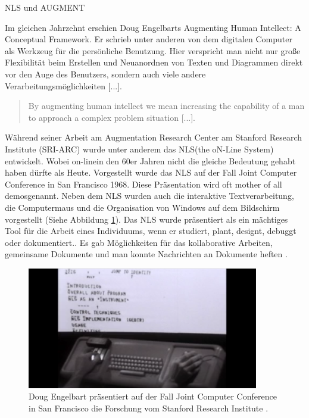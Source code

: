 \begin{section}{NLS und AUGMENT}
\label{sec:nls}

Im gleichen Jahrzehnt erschien Doug Engelbarts \glqq Augmenting Human Intellect: A Conceptual Framework\grqq{ }. Er schrieb unter anderen von dem \glqq digitalen Computer als Werkzeug für die persönliche Benutzung. Hier verspricht man nicht nur große Flexibilität beim Erstellen und Neuanordnen von Texten und Diagrammen direkt vor den Auge des Benutzers, sondern auch viele andere Verarbeitungsmöglichkeiten [...]\grqq{ }\cite[S. 17]{Engelbart1962}.

\begin{quote}
\glqq By augmenting human intellect we mean increasing the capability of a man to approach a complex problem situation [...].\grqq{ }\cite[S. 1]{Engelbart1962}
\end{quote}

Während seiner Arbeit am Augmentation Research Center am Stanford Research Institute (SRI-ARC) wurde unter anderem das \glqq NLS\grqq{ }(the oN-Line System) entwickelt. Wobei \glqq on-line\grqq{ }in den 60er Jahren nicht die gleiche Bedeutung gehabt haben dürfte als Heute. Vorgestellt wurde das NLS auf der Fall Joint Computer Conference in San Francisco 1968. Diese Präsentation wird oft \glqq mother of all demos\grqq{ }genannt. Neben dem NLS wurden auch die interaktive Textverarbeitung, die Computermaus und die Organisation von Windows auf dem Bildschirm vorgestellt (Siehe Abbildung \ref{fig:mother}). Das NLS wurde präsentiert als \glqq ein mächtiges Tool für die Arbeit eines Individuums, wenn er studiert, plant, designt, debuggt oder dokumentiert.\grqq{ }\cite{MotherOfDemo1968}. Es gab Möglichkeiten für das kollaborative Arbeiten, gemeinsame Dokumente und man konnte Nachrichten an Dokumente heften \cite{MotherOfDemo1968}. 

\begin{figure}[!ht]
	\centering
	\includegraphics[width=0.9\textwidth]{image/mother}
	\caption{Doug Engelbart präsentiert auf der Fall Joint Computer Conference in San Francisco die Forschung vom Stanford Research Institute \cite{MotherOfDemo1968}.}
	\label{fig:mother}
\end{figure}


\end{section}
